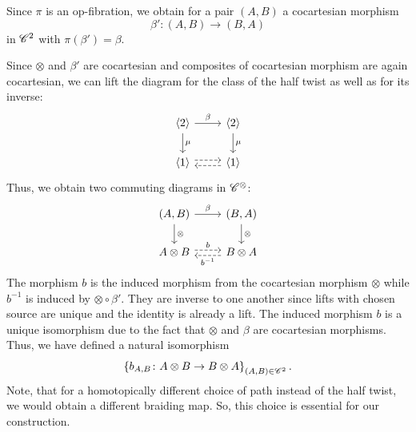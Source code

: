 \begin{const}
\begin{center}
\end{center}

Since $\pi$ is an op-fibration, we obtain for a pair $(A,B)$ a cocartesian
morphism $$\beta' \colon (A,B) \to (B,A)$$ in $\mathscr{C}^2$ with $\pi(\beta')=\beta$.


Since $\otimes$ and $\beta'$ are cocartesian and composites of cocartesian
morphism are again cocartesian, we can lift the diagram for the class of the
half twist as well as for its inverse:
\[    
    \begin{tikzcd}
        \langle 2 \rangle \arrow[r, "\beta"] \arrow[d, "\mu"] & \langle 2 \rangle \arrow[d, "\mu"] \\
        \langle 1 \rangle  \arrow[r, dashed, shift left]                  & \langle 1 \rangle \arrow[l, dashed, shift left]                
    \end{tikzcd}
\]
Thus, we obtain two commuting diagrams in $\mathscr{C}^{\otimes}$:
\[
\begin{tikzcd}
{(A,B)} \arrow[r, "\beta"] \arrow[d, "\otimes"] & {(B,A)} \arrow[d, "\otimes"]                        \\
A \otimes B \arrow[r, "b", dashed, shift left]  & B \otimes A \arrow[l, "b^{-1}", dashed, shift left]
\end{tikzcd}
\]
The morphism $b$ is the induced morphism from the cocartesian morphism $\otimes$
while $b^{-1}$ is induced by $\otimes \circ \beta'$. They are inverse to one
another since lifts with chosen source are unique and the identity is already a
lift. The induced morphism $b$ is a unique isomorphism due to the fact that
$\otimes$ and $\beta$ are cocartesian morphisms. Thus, we have defined a natural
isomorphism
\[
    \left\{b_{A,B} \colon A \otimes B \to B \otimes A\right\}_{(A,B) \in \mathscr{C}^2}.
\]
Note, that for a homotopically different choice of path instead of the half
twist, we would obtain a different braiding map. So, this choice is essential
for our construction.


\end{const}
